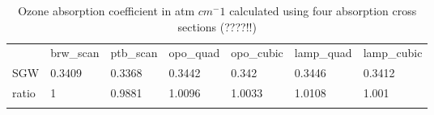 \documentclass[acp]{copernicus} %
\begin{document}
\begin{table}[t]
\caption{Ozone absorption coefficient in atm $cm^-1$ calculated using  four absorption cross sections (????!!)}
\begin{tabular}{lllllll}
\tophline
     & brw\_scan & ptb\_scan & opo\_quad & opo\_cubic & lamp\_quad & lamp\_cubic \\
\middlehline
SGW   & 0.3409    & 0.3368    & 0.3442    & 0.342      & 0.3446     & 0.3412      \\
ratio & 1         & 0.9881    & 1.0096    & 1.0033     & 1.0108     & 1.001      \\
\bottomhline
\end{tabular}

\belowtable{} %
\label{tab:o3abs_sum}
\end{table}











\end{document}
